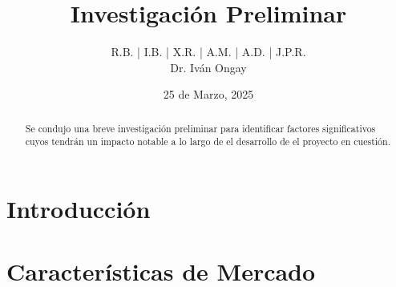 \documentclass{article}
\title{\textbf{Investigación Preliminar}}
\author{R.B. | I.B. | X.R. | A.M. | A.D. | J.P.R. \\ Dr. Iván Ongay}
\date{25 de Marzo, 2025}
\begin{document}
\pagecolor{black} 
\color{white}
\maketitle


\begin{abstract}
    Se condujo una breve investigación preliminar para identificar factores significativos cuyos tendrán un impacto notable a lo largo de el desarrollo de el proyecto en cuestión. 
\end{abstract}

\begin{Large}
\tableofcontents
\end{Large}%
\pagebreak

\section{Introducción} \label{sec:intro}


\section{Características de Mercado} \label{sec:caracmerc}


 
\end{document}
